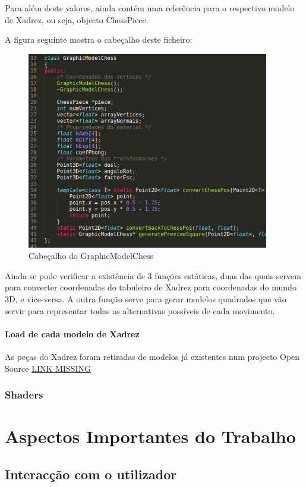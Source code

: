 \documentclass[11pt,a4paper]{report}
\begin{document}
Para além deste valores, ainda contém uma referência para o respectivo modelo de Xadrez, ou seja, objecto ChessPiece.

A figura seguinte mostra o cabeçalho deste ficheiro:

\begin{figure}[H]
\centerline{\includegraphics[width=300pt]{images/graphicmodelchess.png}}
\caption{Cabeçalho do GraphicModelChess}
\label{img:complete}
\end{figure}

Ainda se pode verificar a existência de 3 funções estáticas, duas das quais servem para converter coordenadas do tabuleiro de Xadrez para coordenadas do mundo 3D, e vice-versa. A outra função serve para gerar modelos quadrados que vão servir para representar todas as alternativas possíveis de cada movimento.

\subsubsection{Load de cada modelo de Xadrez}

As peças do Xadrez foram retiradas de modelos já existentes num projecto Open Source \url{LINK MISSING}

\subsection{Shaders}

\chapter{Aspectos Importantes do Trabalho}

\section{Interacção com o utilizador}
\end{document}
